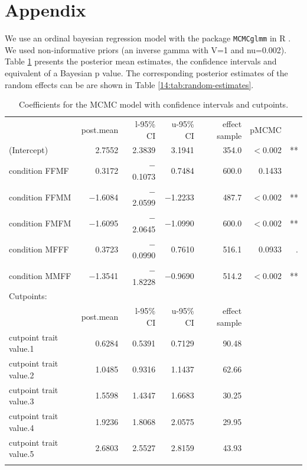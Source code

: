 \documentclass[output=paper,
modfonts,
newtxmath,
hidelinks
]{langscibook}
\begin{document}
{\sloppy
\printbibliography[heading=subbibliography,notkeyword=this]
}

\section*{Appendix}	
		
We use an ordinal bayesian regression model with the package \texttt{MCMCglmm} \citep{Hadfield.2010} in R \citep{rcore}. We used non-informative priors (an inverse gamma with V=1 and nu=0.002).  Table \ref{14:tab:estimates} presents the posterior mean estimates, the confidence intervals and equivalent of a Bayesian p value. The corresponding posterior estimates of the random effects can be are shown in Table \ref{14:tab:random-estimates}.

\begin{table}[h]
\footnotesize

\begin{tabularx}{\textwidth}{lrrrrrr}
\lsptoprule
& post.mean & l-95\% CI & u-95\% CI & effect sample & pMCMC    &    \\
(Intercept)            & 2.7552    & 2.3839    & 3.1941    & 354.0         & $<$0.002 & ** \\
condition FFMF         & 0.3172    & $-$0.1073   & 0.7484    & 600.0         & 0.1433   &    \\
condition FFMM         & $-$1.6084   & $-$2.0599   & $-$1.2233   & 487.7         & $<$0.002 & ** \\
condition FMFM         & $-$1.6095   & $-$2.0645   & $-$1.0990   & 600.0         & $<$0.002 & ** \\
condition MFFF         & 0.3723    & $-$0.0990   & 0.7610    & 516.1         & 0.0933   & .  \\
condition MMFF         & $-$1.3541   & $-$1.8228   & $-$0.9690   & 514.2         & $<$0.002 & ** \\
\midrule
Cutpoints:                                                                                 \\
& post.mean & l-95\% CI & u-95\% CI & effect sample                 \\
cutpoint trait value.1 & 0.6284    & 0.5391    & 0.7129    & 90.48                         \\
cutpoint trait value.2 & 1.0485    & 0.9316    & 1.1437    & 62.66                         \\
cutpoint trait value.3 & 1.5598    & 1.4347    & 1.6683    & 30.25                         \\
cutpoint trait value.4 & 1.9236    & 1.8068    & 2.0575    & 29.95                         \\
cutpoint trait value.5 & 2.6803    & 2.5527    & 2.8159    & 43.93                         \\
\lspbottomrule
\end{tabularx}
\caption{Coefficients for the MCMC model with confidence intervals and cutpoints.}
\label{14:tab:estimates}
\end{table}
\end{document}
